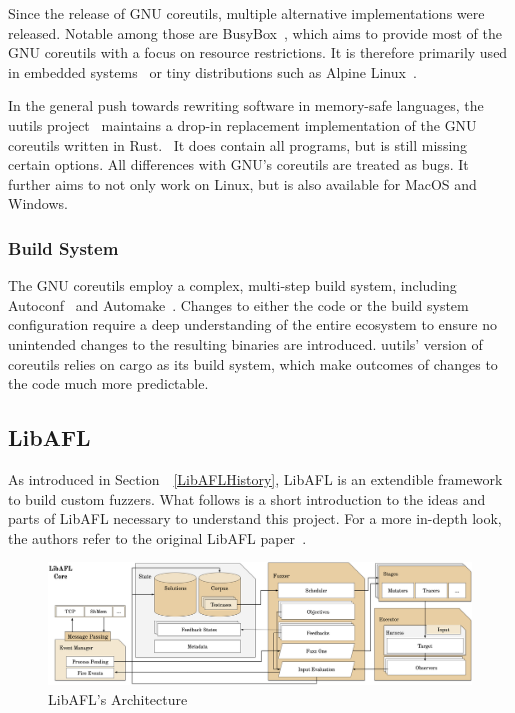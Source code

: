\documentclass{article}
\let\savedCite=\cite
\renewcommand{\cite}{\unskip~\savedCite}
\let\savedRef=\ref
\renewcommand{\ref}{\unskip~\savedRef}
\begin{document}
\begin{multicols}{2}
    Since the release of GNU coreutils, multiple alternative implementations were released. Notable among those are BusyBox\cite{BusyBox}, which aims to provide most of the GNU coreutils with a focus on resource restrictions. It is therefore primarily used in embedded systems\cite{BusyBox} or tiny distributions such as Alpine Linux\cite{Alpine}.

    In the general push towards rewriting software in memory-safe languages, the uutils project\cite{Uutils} maintains a drop-in replacement implementation of the GNU coreutils written in Rust.\cite{UutilsCoreUtils} It does contain all programs, but is still missing certain options. All differences with GNU's coreutils are treated as bugs. It further aims to not only work on Linux, but is also available for MacOS and Windows.

    \subsubsection{Build System}

    The GNU coreutils employ a complex, multi-step build system, including Autoconf\cite{Autoconf} and Automake\cite{Automake}. Changes to either the code or the build system configuration require a deep understanding of the entire ecosystem to ensure no unintended changes to the resulting binaries are introduced. uutils' version of coreutils relies on cargo as its build system, which make outcomes of changes to the code much more predictable.

    \subsection{LibAFL}
    \label{LibAFLBackground}
    As introduced in Section~\ref{LibAFLHistory}, LibAFL is an extendible framework to build custom fuzzers. What follows is a short introduction to the ideas and parts of LibAFL necessary to understand this project. For a more in-depth look, the authors refer to the original LibAFL paper\cite{LibAFL}.

\end{multicols}
\begin{figure}[htbp]
    \centering
    \includegraphics[width=\textwidth]{assets/LibAFLArchitecture.png}
    \caption{LibAFL's Architecture\cite{LibAFL}}
    \label{fig:LibAFLArchitecture}
\end{figure}
\end{document}
